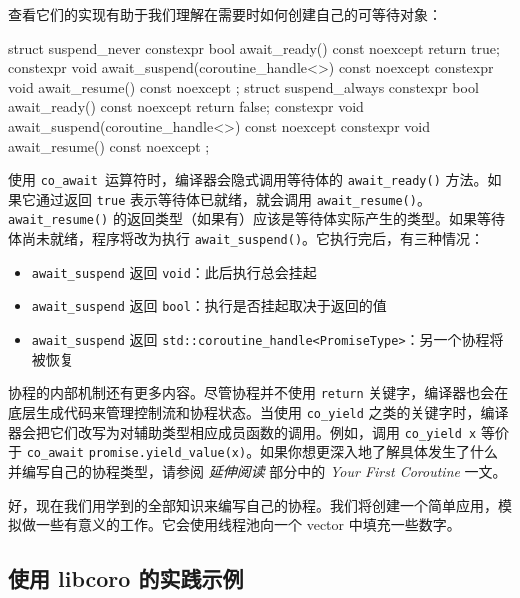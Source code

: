 \label{idx:1269}
查看它们的实现有助于我们理解在需要时如何创建自己的可等待对象：

\begin{codebox}[cpp]
struct suspend_never {
    constexpr bool await_ready() const noexcept { return true; }
    constexpr void await_suspend(coroutine_handle<>) const noexcept {}
    constexpr void await_resume() const noexcept {}
};
struct suspend_always {
    constexpr bool await_ready() const noexcept { return false; }
    constexpr void await_suspend(coroutine_handle<>) const noexcept {}
    constexpr void await_resume() const noexcept {}
};
\end{codebox}

使用 \texttt{co\_\allowbreak{}await }运算符时，编译器会隐式调用等待体的 \texttt{await\_\allowbreak{}ready(\allowbreak{})\allowbreak{}} 方法。如果它通过返回 \texttt{true} 表示等待体已就绪，就会调用 \texttt{await\_\allowbreak{}resume(\allowbreak{})\allowbreak{}}。\texttt{await\_\allowbreak{}resume(\allowbreak{})\allowbreak{}} 的返回类型（如果有）应该是等待体实际产生的类型。如果等待体尚未就绪，程序将改为执行 \texttt{await\_\allowbreak{}suspend(\allowbreak{})\allowbreak{}}。它执行完后，有三种情况：

\begin{itemize}
\item \texttt{await\_\allowbreak{}suspend} 返回 \texttt{void}：此后执行总会挂起
\item \texttt{await\_\allowbreak{}suspend} 返回 \texttt{bool}：执行是否挂起取决于返回的值
\item \texttt{await\_\allowbreak{}suspend} 返回 \texttt{std::\allowbreak{}coroutine\_\allowbreak{}handle<Promise\allowbreak{}Type>}：另一个协程将被恢复
\end{itemize}

\label{idx:1270}
\label{idx:1271}
协程的内部机制还有更多内容。尽管协程并不使用 \texttt{return} 关键字，编译器也会在底层生成代码来管理控制流和协程状态。当使用 \texttt{co\_yield} 之类的关键字时，编译器会把它们改写为对辅助类型相应成员函数的调用。例如，调用 \texttt{co\_\allowbreak{}yield x} 等价于 \texttt{co\_await} \texttt{promise.\allowbreak{}yield\_\allowbreak{}value(\allowbreak{}x)\allowbreak{}}。如果你想更深入地了解具体发生了什么并编写自己的协程类型，请参阅 \emph{延伸阅读} 部分中的 \emph{Your First Coroutine} 一文。

好，现在我们用学到的全部知识来编写自己的协程。我们将创建一个简单应用，模拟做一些有意义的工作。它会使用线程池向一个 vector 中填充一些数字。

\subsection{使用 libcoro 的实践示例}

